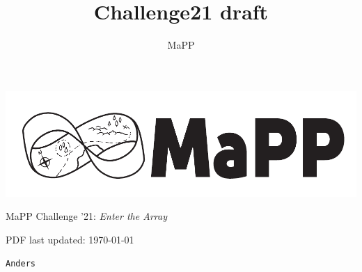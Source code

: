 \documentclass{article}
\title{Challenge21 draft}
\author{MaPP}
\newcommand{\puzzleTitle}[1]{
\begin{center}
{\Large \texttt{#1}}
\end{center}
}
\begin{document}

\thispagestyle{empty}
\begin{center}
\includegraphics[width=0.8\linewidth]{banner_bw}

\Large MaPP Challenge '21: \textit{Enter the Array}

\end{center}

\vspace{1in}


\vspace{1em}

\noindent

\vfill

{\footnotesize PDF last updated: \today}

\newpage

\puzzleTitle{Anders}

\vfill
\end{document}
